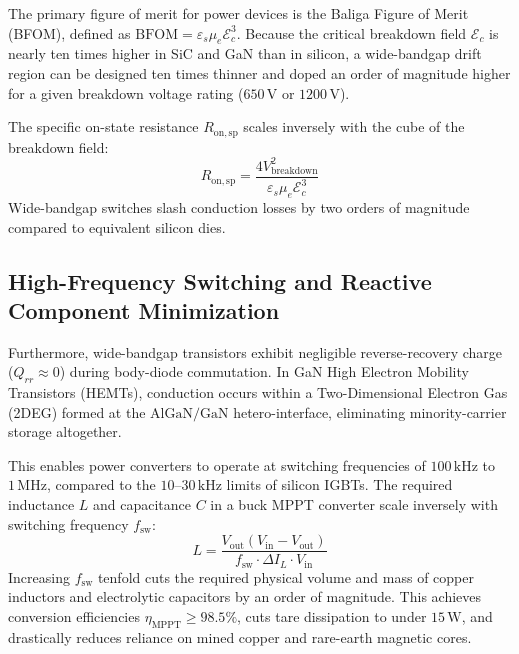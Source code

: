 The primary figure of merit for power devices is the Baliga Figure of Merit (BFOM), defined as $\mathrm{BFOM} = \varepsilon_s \mu_e \mathcal{E}_c^3$. Because the critical breakdown field $\mathcal{E}_c$ is nearly ten times higher in SiC and GaN than in silicon, a wide-bandgap drift region can be designed ten times thinner and doped an order of magnitude higher for a given breakdown voltage rating ($650\,\mathrm{V}$ or $1200\,\mathrm{V}$).

The specific on-state resistance $R_{\mathrm{on},\mathrm{sp}}$ scales inversely with the cube of the breakdown field:
\begin{equation}
R_{\mathrm{on},\mathrm{sp}} = \frac{4 V_{\mathrm{breakdown}}^2}{\varepsilon_s \mu_e \mathcal{E}_c^3}
\label{eq:ron_sp}
\end{equation}
Wide-bandgap switches slash conduction losses by two orders of magnitude compared to equivalent silicon dies.

\subsection{High-Frequency Switching and Reactive Component Minimization}

Furthermore, wide-bandgap transistors exhibit negligible reverse-recovery charge ($Q_{rr} \approx 0$) during body-diode commutation. In GaN High Electron Mobility Transistors (HEMTs), conduction occurs within a Two-Dimensional Electron Gas (2DEG) formed at the $\mathrm{AlGaN/GaN}$ hetero-interface, eliminating minority-carrier storage altogether.

This enables power converters to operate at switching frequencies of $100\,\mathrm{kHz}$ to $1\,\mathrm{MHz}$, compared to the $10$--$30\,\mathrm{kHz}$ limits of silicon IGBTs. The required inductance $L$ and capacitance $C$ in a buck MPPT converter scale inversely with switching frequency $f_{\mathrm{sw}}$:
\begin{equation}
L = \frac{V_{\mathrm{out}} (V_{\mathrm{in}} - V_{\mathrm{out}})}{f_{\mathrm{sw}} \cdot \Delta I_L \cdot V_{\mathrm{in}}}
\label{eq:mppt_inductance}
\end{equation}
Increasing $f_{\mathrm{sw}}$ tenfold cuts the required physical volume and mass of copper inductors and electrolytic capacitors by an order of magnitude. This achieves conversion efficiencies $\eta_{\mathrm{MPPT}} \ge 98.5\%$, cuts tare dissipation to under $15\,\mathrm{W}$, and drastically reduces reliance on mined copper and rare-earth magnetic cores.

